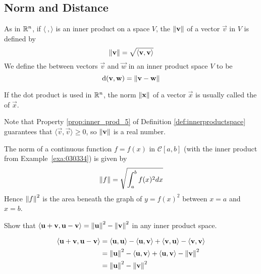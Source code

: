 \documentclass{ximera}
\begin{document}
\subsection*{Norm and Distance}

\begin{definition}\label{def:030438}
As in $\mathbb{R}^n$, if $\langle\ , \rangle$ is an inner product on a space $V$, the 
 $\left\lVert\mathbf{v}\right\rVert$ of a vector $\vec{v}$ in $V$ is defined by
\begin{equation*}
\left\lVert \mathbf{v} \right\rVert = \sqrt{\langle \mathbf{v}, \mathbf{v} \rangle}
\end{equation*}
We define the  between vectors $\vec{v}$ and $\vec{w}$ in an inner product space $V$ to be
\begin{equation*}
\mbox{d}(\mathbf{v}, \mathbf{w}) = \left\lVert \mathbf{v} - \mathbf{w} \right\rVert
\end{equation*}
\end{definition}

\begin{remark}
 If the dot product is used in $\mathbb{R}^n$, the norm $\left\lVert\mathbf{x}\right\rVert$ of a vector $\vec{x}$ is usually called the  of $\vec{x}$.   
\end{remark}


Note that  Property \ref{prop:inner_prod_5} of Definition \ref{def:innerproductspace} guarantees that
$\langle\vec{v}, \vec{v}\rangle \geq 0$, so $\left\lVert\mathbf{v}\right\rVert$ is a real number.

\begin{example}\label{exa:030446}

The norm of a continuous function $f = f(x)$ in $\mathcal{C}[a, b]$ (with the inner product from Example~\ref{exa:030334}) is given by
\begin{equation*}
\left\lVert f \right\rVert = \sqrt{\int_{a}^{b} f(x)^2dx}
\end{equation*}
Hence $\left\lVert f\right\rVert^{2}$ is the area beneath the graph of $y = f(x)^{2}$ between $x = a$ and $x = b$.
\end{example}

\begin{example}\label{030454}
Show that $\langle\mathbf{u} + \mathbf{v}, \mathbf{u} - \mathbf{v}\rangle = \left\lVert\mathbf{u}\right\rVert^{2} - \left\lVert\mathbf{v}\right\rVert^{2}$ in any inner product space.

\begin{explanation}
\begin{align*}
\langle \mathbf{u} + \mathbf{v}, \mathbf{u} - \mathbf{v} \rangle &= \langle \mathbf{u}, \mathbf{u} \rangle - \langle \mathbf{u}, \mathbf{v} \rangle + \langle \mathbf{v}, \mathbf{u} \rangle - \langle \mathbf{v}, \mathbf{v} \rangle \\
&= \left\lVert \mathbf{u} \right\rVert^2 - \langle \mathbf{u}, \mathbf{v} \rangle + \langle \mathbf{u}, \mathbf{v} \rangle - \left\lVert \mathbf{v} \right\rVert^2 \\
&= \left\lVert \mathbf{u} \right\rVert^2 - \left\lVert \mathbf{v} \right\rVert^2
\end{align*}
\end{explanation}
\end{example}
\end{document}
